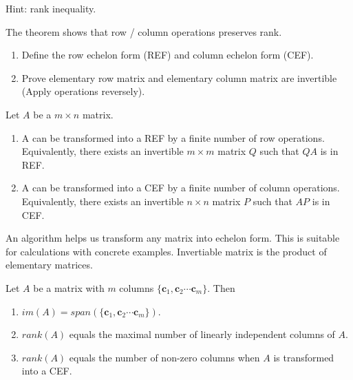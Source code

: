 \documentclass[12pt]{article}
\begin{document}
\begin{pf}
    Hint: rank inequality.
\end{pf}

The theorem shows that row / column operations preserves rank.

\begin{exercise}
    \begin{enumerate}
        \item Define the row echelon form (REF) and column echelon form (CEF).
        \item Prove elementary row matrix and elementary column matrix are invertible (Apply operations reversely).
    \end{enumerate}
\end{exercise}

\begin{theorem}
    Let $A$ be a $m\times n$ matrix.
    \begin{enumerate}
        \item A can be transformed into a REF by a finite number of row operations. Equivalently, there exists an invertible $m\times m$ matrix $Q$ such that $QA$ is in REF.
        \item A can be transformed into a CEF by a finite number of column operations. Equivalently, there exists an invertible $n\times n$ matrix $P$ such that $AP$ is in CEF.
    \end{enumerate}
\end{theorem}

\begin{pf}
    An algorithm helps us transform any matrix into echelon form. This is suitable for calculations with concrete examples.
    Invertiable matrix is the product of elementary matrices.
\end{pf}

\begin{theorem}
    Let $A$ be a matrix with $m$ columns $\{\mathbf{c}_1, \mathbf{c}_2\cdots\mathbf{c}_m\}$.
    Then 
    \begin{enumerate}
        \item $im(A)=span(\{\mathbf{c}_1, \mathbf{c}_2\cdots\mathbf{c}_m\})$.
        \item $rank(A)$ equals the maximal number of linearly independent columns of $A$.
        \item $rank(A)$ equals the number of non-zero columns when $A$ is transformed into a CEF.
    \end{enumerate} 
\end{theorem}
\end{document}
